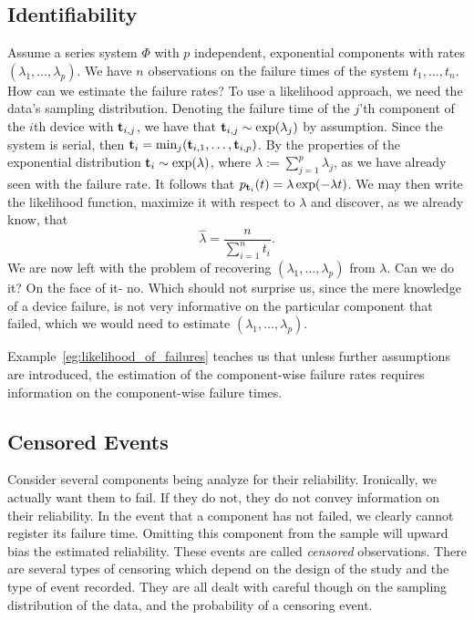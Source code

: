 \subsection{Identifiability}

\begin{example}
\label{eg:likelihood_of_failures}
Assume a series system $\Phi$ with $p$ independent, exponential components with rates $(\lambda_1,\dots,\lambda_p)$.
We have $n$ observations on the failure times of the system $t_1,\dots,t_n$.
How can we estimate the failure rates?
To use a likelihood approach, we need the data's sampling distribution.
Denoting the failure time of the $j$'th component of the $i$th device with $\mathbf{t}_{i,j}$, we have that $\mathbf{t}_{i,j}\sim \exp(\lambda_j)$ by assumption.
Since the system is serial, then $\mathbf{t}_i=\min_j(\mathbf{t}_{i,1},\dots,\mathbf{t}_{i,p})$.
By the properties of the exponential distribution $\mathbf{t}_i \sim \exp(\lambda)$, where $\lambda:=\sum_{j=1}^{p} \lambda_j$, as we have already seen with the failure rate. It follows that
$p_{\mathbf{t}_i} (t)=\lambda \exp(-\lambda t)$.
We may then write the likelihood function, maximize it with respect to $\lambda$ and discover, as we already know, that $$\hat{\lambda}=\frac{n}{\sum_{i=1}^{n} t_i}.$$
We are now left with the problem of recovering $(\lambda_1,\dots,\lambda_p)$ from $\lambda$. 
Can we do it? On the face of it- no. Which should not surprise us, since the mere knowledge of a device failure, is not very informative on the particular component that failed, which we would need to estimate $(\lambda_1,\dots,\lambda_p)$.
\end{example}

Example~\ref{eg:likelihood_of_failures} teaches us that unless further assumptions are introduced, the estimation of the component-wise failure rates requires information on the component-wise failure times. 





\subsection{Censored Events}
Consider several components being analyze for their reliability. 
Ironically, we actually want them to fail. If they do not, they do not convey information on their reliability.
In the event that a component has not failed, we clearly cannot register its failure time. Omitting this component from the sample will upward bias the estimated reliability.
These events are called \emph{censored} observations. 
There are several types of censoring which depend on the design of the study and the type of event recorded. 
They are all dealt with careful though on the sampling distribution of the data, and the probability of a censoring event. 

